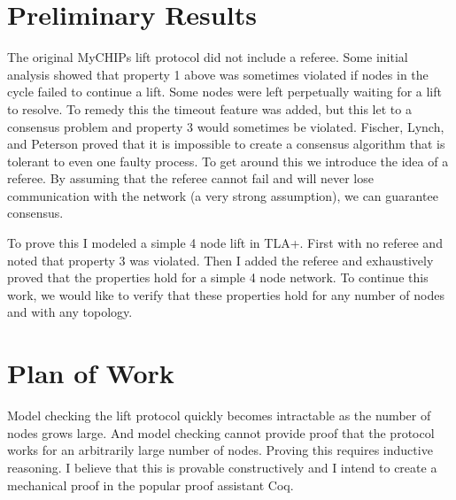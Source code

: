 \documentclass[article, onecolumn, 12pt]{IEEEtran}
\begin{document}
\section{Preliminary Results}
The original MyCHIPs lift protocol did not include a referee. Some initial analysis showed that property 1 above was sometimes violated if nodes in the cycle failed to continue a lift. Some nodes were left perpetually waiting for a lift to resolve. To remedy this the timeout feature was added, but this let to a consensus problem and property 3 would sometimes be violated. Fischer, Lynch, and Peterson \cite{Fischer} proved that it is impossible to create a consensus algorithm that is tolerant to even one faulty process. To get around this we introduce the idea of a referee. By assuming that the referee cannot fail and will never lose communication with the network (a very strong assumption), we can guarantee consensus. 

To prove this I modeled a simple 4 node lift in TLA+. First with no referee and noted that property 3 was violated. Then I added the referee and exhaustively proved that the properties hold for a simple 4 node network. To continue this work, we would like to verify that these properties hold for any number of nodes and with any topology. 

\section{Plan of Work}
Model checking the lift protocol quickly becomes intractable as the number of nodes grows large. And model checking cannot provide proof that the protocol works for an arbitrarily large number of nodes. Proving this requires inductive reasoning. I believe that this is provable constructively and I intend to create a mechanical proof in the popular proof assistant Coq. 
\end{document}

